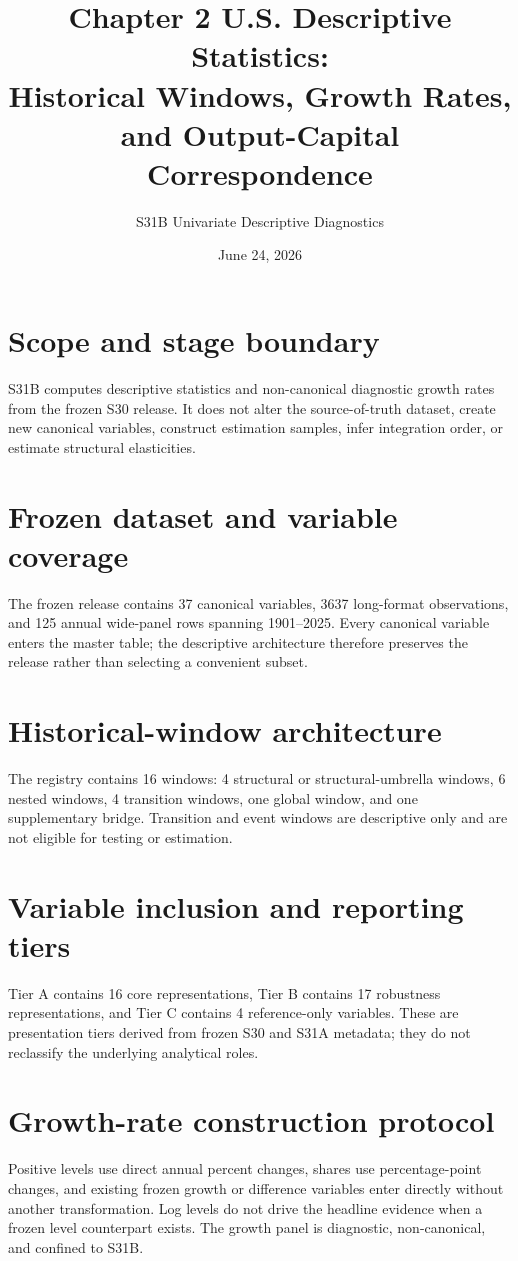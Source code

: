 \documentclass[11pt]{article}
\title{Chapter 2 U.S. Descriptive Statistics:\\Historical Windows, Growth Rates, and Output-Capital Correspondence}
\author{S31B Univariate Descriptive Diagnostics}
\date{June 24, 2026}
\begin{document}
\maketitle
\tableofcontents
\clearpage
\section{Scope and stage boundary}
S31B computes descriptive statistics and non-canonical diagnostic growth rates from the frozen S30 release.
It does not alter the source-of-truth dataset, create new canonical variables, construct estimation samples, infer integration order, or estimate structural elasticities.
\section{Frozen dataset and variable coverage}
The frozen release contains 37 canonical variables, 3637 long-format observations, and 125 annual wide-panel rows spanning 1901--2025. Every canonical variable enters the master table; the descriptive architecture therefore preserves the release rather than selecting a convenient subset.
\section{Historical-window architecture}
The registry contains 16 windows: 4 structural or structural-umbrella windows, 6 nested windows, 4 transition windows, one global window, and one supplementary bridge. Transition and event windows are descriptive only and are not eligible for testing or estimation.
\section{Variable inclusion and reporting tiers}
Tier A contains 16 core representations, Tier B contains 17 robustness representations, and Tier C contains 4 reference-only variables. These are presentation tiers derived from frozen S30 and S31A metadata; they do not reclassify the underlying analytical roles.
\section{Growth-rate construction protocol}
Positive levels use direct annual percent changes, shares use percentage-point changes, and existing frozen growth or difference variables enter directly without another transformation. Log levels do not drive the headline evidence when a frozen level counterpart exists. The growth panel is diagnostic, non-canonical, and confined to S31B.
\end{document}
